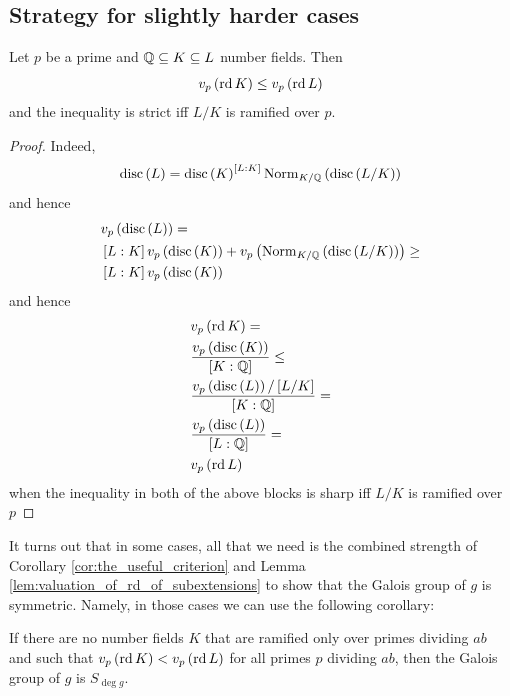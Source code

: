 \documentclass[../main.tex]{subfiles}
\begin{document}
\subsection{Strategy for slightly harder cases}

\begin{lemma}
  \label{lem:valuation_of_rd_of_subextensions}
  Let $p$ be a prime and $\mathbb{Q} \subseteq K \subseteq L$ number fields.
  Then 
  \[
    v_p\left( \operatorname{\rm rd} K \right) \leq v_p \left( \operatorname{\rm rd} L \right)
  \]
  and the inequality is strict iff $L/K$ is ramified over $p$.
\end{lemma}
\begin{proof}
  Indeed, 
  \[
    \operatorname{disc}\left( L \right) = \operatorname{disc}\left( K \right)^{\left[ L : K \right]} \operatorname{\rm Norm}_{K / \mathbb{Q}}\left( \operatorname{disc}\left( L / K \right) \right)
  \]
  and hence 
  \begin{align*}
    & 
    v_p\left( \operatorname{disc}\left( L \right) \right) = \\
    & \left[ L : K \right] v_p\left( \operatorname{disc}\left( K \right) \right) + v_p\left( \operatorname{\rm Norm}_{K / \mathbb{Q}}\left( \operatorname{disc}\left( L / K \right) \right) \right) \geq \\
    & \left[ L : K \right] v_p\left( \operatorname{disc}\left( K \right) \right)
  \end{align*}
  and hence
  \begin{align*}
    & v_p \left( \operatorname{\rm rd} K \right) = \\
    & \frac{v_p\left( \operatorname{disc}\left( K \right) \right)}{\left[ K : \mathbb{Q} \right]} \leq \\
    & \frac{v_p\left( \operatorname{disc}\left( L \right) \right) / \left[ L / K \right]}{\left[ K : \mathbb{Q} \right]} = \\
    & \frac{v_p\left( \operatorname{disc}\left( L \right) \right)}{\left[ L : \mathbb{Q} \right]} = \\
    & v_p\left( \operatorname{\rm rd} L \right)
  \end{align*}
  when the inequality in both of the above blocks is sharp iff $L/K$ is ramified over $p$ 
\end{proof}
It turns out that in some cases, all that we need is the combined strength of Corollary \ref{cor:the_useful_criterion} and Lemma \ref{lem:valuation_of_rd_of_subextensions} to show that the Galois group of $g$ is symmetric.
Namely, in those cases we can use the following corollary: 
\begin{corollary}
  If there are no number fields $K$ that are ramified only over primes dividing $a b$ and such that $v_p\left( \operatorname{\rm rd} K \right) < v_p\left( \operatorname{\rm rd} L \right)$ for all primes $p$ dividing $a b$, then the Galois group of $g$ is $S_{\deg g}$.
\end{corollary}
\end{document}
